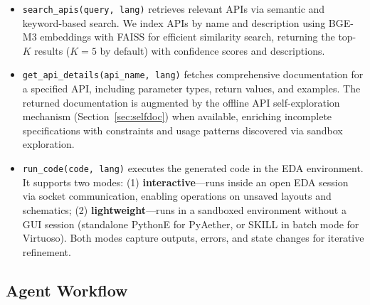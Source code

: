 \documentclass[anonymous, sigconf]{acmart}
\begin{document}
\begin{itemize}
    \item \texttt{search\_apis(query, lang)} retrieves relevant APIs via semantic and keyword-based search. We index APIs by name and description using BGE-M3 embeddings \cite{bge2024} with FAISS \cite{douze2024faiss} for efficient similarity search, returning the top-$K$ results ($K=5$ by default) with confidence scores and descriptions.
    
    \item \texttt{get\_api\_details(api\_name, lang)} fetches comprehensive documentation for a specified API, including parameter types, return values, and examples. The returned documentation is augmented by the offline API self-exploration mechanism (Section~\ref{sec:selfdoc}) when available, enriching incomplete specifications with constraints and usage patterns discovered via sandbox exploration.
    
    \item \texttt{run\_code(code, lang)} executes the generated code in the EDA environment. It supports two modes: (1) \textbf{interactive}—runs inside an open EDA session via socket communication, enabling operations on unsaved layouts and schematics; (2) \textbf{lightweight}—runs in a sandboxed environment without a GUI session (standalone PythonE for PyAether, or SKILL in batch mode for Virtuoso). Both modes capture outputs, errors, and state changes for iterative refinement.
\end{itemize}

\subsection{Agent Workflow}
\label{sec:agent-workflow}
\end{document}
